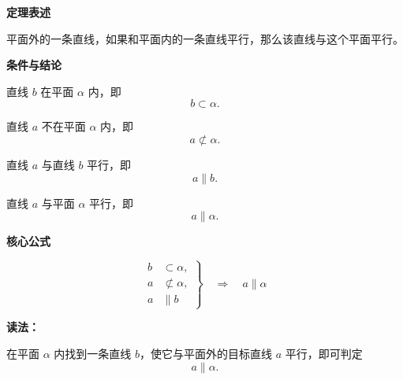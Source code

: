 \begin{statementbox}
	\textbf{\textcolor{CStatement}{定理表述}}

	平面外的一条直线，如果和平面内的一条直线平行，那么该直线与这个平面平行。

	\medskip
	\textbf{\textcolor{CStatement}{条件与结论}}
	\begin{description}[
			style=nextline,
			leftmargin=2.8em,
			labelsep=0.5em,
			itemsep=0.4em
		]
		\item[\textbf{条件1（面内参照线）：}]
		      直线 $b$ 在平面 $\alpha$ 内，即
		      \[
			      b\subset\alpha.
		      \]

		\item[\textbf{条件2（目标线不在面内）：}]
		      直线 $a$ 不在平面 $\alpha$ 内，即
		      \[
			      a\not\subset\alpha.
		      \]

		\item[\textbf{条件3（两线平行）：}]
		      直线 $a$ 与直线 $b$ 平行，即
		      \[
			      a\parallel b.
		      \]

		\item[\textbf{结论（线面平行）：}]
		      直线 $a$ 与平面 $\alpha$ 平行，即
		      \[
			      a\parallel\alpha.
		      \]
	\end{description}

	\medskip
	\textbf{\textcolor{CStatement}{核心公式}}

	\[
		\left.
		\begin{aligned}
			b & \subset \alpha,     \\
			a & \not\subset \alpha, \\
			a & \parallel b
		\end{aligned}
		\right\}
		\quad\Longrightarrow\quad
		a\parallel\alpha
	\]

	\textbf{\textcolor{CStatement}{读法：}}

	在平面 $\alpha$ 内找到一条直线 $b$，使它与平面外的目标直线 $a$ 平行，即可判定
	\[
		a\parallel\alpha.
	\]
\end{statementbox}